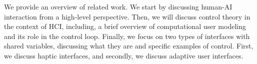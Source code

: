 We provide an overview of related work. We start by discussing human-AI interaction from a high-level perspective. Then, we will discuss control theory in the context of HCI, including, a brief overview of computational user modeling and its role in the control loop. Finally, we focus on two types of interfaces with shared variables, discussing what they are and specific examples of control. First, we discuss haptic interfaces, and secondly, we discuss adaptive user interfaces. 
